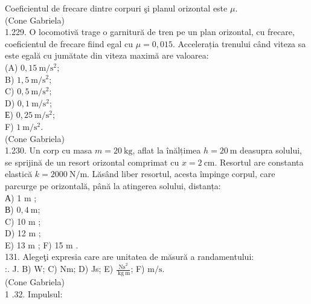 \documentclass[10pt]{article}
\begin{document}
Coeficientul de frecare dintre corpuri şi planul orizontal este $\mu$.\\
(Cone Gabriela)\\
1.229. O locomotivă trage o garnitură de tren pe un plan orizontal, cu frecare, coeficientul de frecare fiind egal cu $\mu=0,015$. Accelerația trenului când viteza sa este egală cu jumătate din viteza maximă are valoarea:\\
(A) $0,15 \mathrm{~m} / \mathrm{s}^{2}$;\\
B) $1,5 \mathrm{~m} / \mathrm{s}^{2}$;\\
C) $0,5 \mathrm{~m} / \mathrm{s}^{2}$;\\
D) $0,1 \mathrm{~m} / \mathrm{s}^{2}$;\\
Е) $0,25 \mathrm{~m} / \mathrm{s}^{2}$;\\
F) $1 \mathrm{~m} / \mathrm{s}^{2}$.\\
(Cone Gabriela)\\
1.230. Un corp cu masa $m=20 \mathrm{~kg}$, aflat la înălțimea $h=20 \mathrm{~m}$ deasupra solului, se sprijină de un resort orizontal comprimat cu $x=2 \mathrm{~cm}$. Resortul are constanta elastică $k=2000 \mathrm{~N} / \mathrm{m}$. Lăsând liber resortul, acesta împinge corpul, care parcurge pe orizontală, până la atingerea solului, distanța:\\
А) 1 m ;\\
В) $0,4 \mathrm{~m}$;\\
C) 10 m ;\\
D) 12 m ;\\
E) 13 m ; F) 15 m .\\
131. Alegeţi expresia care are unitatea de măsură a randamentului:\\
:. J. B) W; C) Nm; D) Js; E) $\frac{\mathrm{Ns}^{2}}{\mathrm{~kg} \mathrm{~m}}$; F) $\mathrm{m} / \mathrm{s}$.\\
(Cone Gabriela)\\
1 .32. Impulsul:
\end{document}
